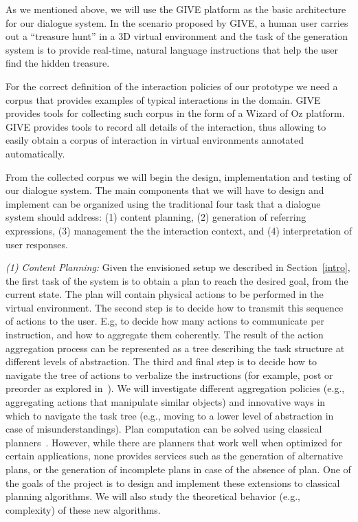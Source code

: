 As we mentioned above, we will use the GIVE platform as the basic architecture 
for our dialogue system.  In the scenario proposed by GIVE, a
human user carries out a ``treasure hunt'' in a 3D virtual environment
and the task of the generation system is to provide real-time, natural
language instructions that help the user find the hidden treasure.

For the correct definition of the interaction policies of our prototype we need
a corpus that provides examples of typical interactions in the domain. GIVE
provides tools for collecting such corpus in the form of a Wizard of Oz
platform. GIVE provides tools to record all details of the interaction, thus
allowing to easily obtain a corpus of interaction in virtual environments
annotated automatically.

From the collected corpus we will begin the design, implementation and testing
of our dialogue system.  The main components that we will have to design and 
implement can be organized using the traditional four task that a dialogue 
system should address: (1) content planning, (2)
generation of referring expressions, (3) management the the interaction context, and
(4) interpretation of user responses. 

\emph{(1) Content Planning:} Given the envisioned setup we described in Section~\ref{intro},
the first task of the system is to obtain a plan to reach the desired goal, from the current state.
The plan will contain physical actions to be performed in the virtual environment. The second
step is to decide how to transmit this sequence of actions to the user. E.g, to decide
how many actions to communicate per instruction, and how to aggregate them
coherently. The result of the action aggregation process can be represented as a
tree describing the task structure at different levels of abstraction. The third
and final step is to decide how to navigate the tree of actions to verbalize the
instructions (for example, post or preorder as
explored in~\cite{foster-etal-ijcai2009}). We will investigate
different aggregation policies (e.g., aggregating actions that
manipulate similar objects) and innovative ways in which to navigate the task tree
(e.g., moving to a lower level of abstraction in case of misunderstandings).
Plan computation can be solved using classical planners~\cite{nau04}.
However, while there are planners that work well when optimized for certain
applications, none provides services such as the generation of alternative
plans, or the generation of incomplete plans in case of the absence of plan.
One of the goals of the project is to design and implement these extensions to 
classical planning algorithms. We will also study the theoretical behavior (e.g., complexity) of
these new algorithms. 

